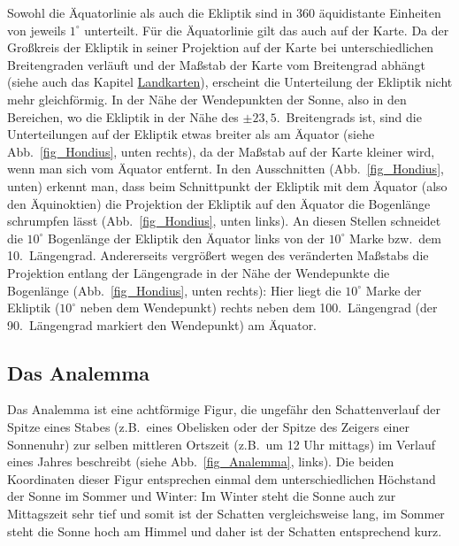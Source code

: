Sowohl die \"Aquatorlinie als auch die Ekliptik sind in $360$ \"aquidistante Einheiten von
jeweils $1^\circ$ unterteilt. F\"ur die \"Aquatorlinie gilt das auch auf der Karte. Da der Gro\ss kreis
der Ekliptik in seiner Projektion auf der Karte bei unterschiedlichen Breitengraden verl\"auft und
der Ma\ss stab der Karte vom Breitengrad abh\"angt (siehe auch das Kapitel \hyperref[chap_Landkarte]{Landkarten}),
erscheint die Unterteilung der Ekliptik nicht mehr gleichf\"ormig.
In der N\"ahe der Wendepunkten der Sonne, also in den Bereichen, wo die
Ekliptik in der N\"ahe des $\pm 23,5$.\ Breitengrads ist, sind die Unterteilungen auf der Ekliptik etwas
breiter als am \"Aquator (siehe Abb.\ \ref{fig_Hondius}, unten rechts), da der Ma\ss stab auf der Karte kleiner
wird, wenn man sich vom \"Aquator entfernt. In den Ausschnitten (Abb.\ \ref{fig_Hondius}, unten)
erkennt man, dass beim Schnittpunkt der Ekliptik mit dem \"Aquator (also den \"Aquinoktien) die
Projektion der Ekliptik auf den \"Aquator die Bogenl\"ange schrumpfen l\"asst (Abb.\ \ref{fig_Hondius}, unten links).
An diesen Stellen schneidet die $10^\circ$ Bogenl\"ange der Ekliptik den \"Aquator links von der
$10^\circ$ Marke bzw.\ dem 10.\ L\"angengrad. Andererseits vergr\"o\ss ert
wegen des ver\"anderten Ma\ss stabs die Projektion entlang der L\"angengrade in der
N\"ahe der Wendepunkte die Bogenl\"ange (Abb.\ \ref{fig_Hondius}, unten rechts): Hier liegt die
$10^\circ$ Marke der Ekliptik ($10^\circ$ neben dem Wendepunkt) rechts neben dem 100.\ L\"angengrad
(der 90.\ L\"angengrad markiert den Wendepunkt) am \"Aquator. 

\subsection{Das Analemma}
\label{sec_Analemma}

Das Analemma 
ist eine achtf\"ormige Figur, die ungef\"ahr den Schattenverlauf der Spitze
eines Stabes (z.B.\ eines Obelisken oder der Spitze des Zeigers einer Sonnenuhr) zur
selben mittleren Ortszeit (z.B.\ um 12 Uhr mittags) im Verlauf eines Jahres beschreibt (siehe
Abb.\ \ref{fig_Analemma}, links). 
Die beiden Koordinaten dieser Figur entsprechen einmal dem unterschiedlichen H\"ochstand
der Sonne im Sommer und Winter: Im Winter steht die Sonne auch zur Mittagszeit sehr tief
und somit ist der Schatten vergleichsweise lang, im Sommer steht die Sonne hoch am
Himmel und daher ist der Schatten entsprechend kurz. 

